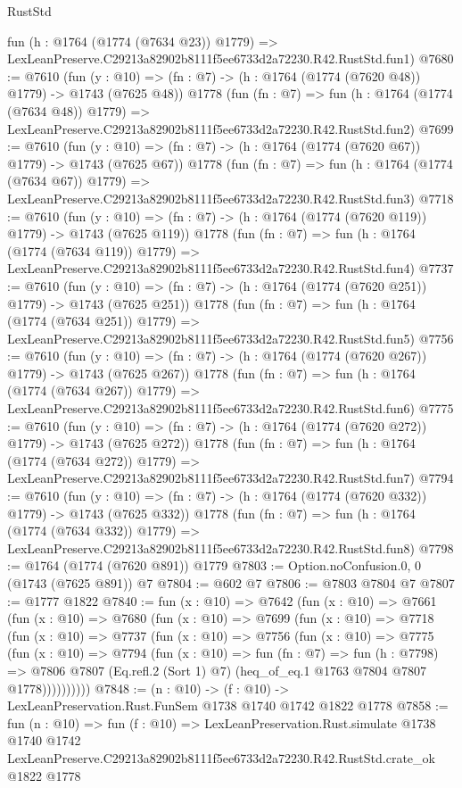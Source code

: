 \begin{lexlean}{RustStd}
\begin{coremodule}
    fun (h : @1764 (@1774 (@7634 @23)) @1779) =>
    LexLeanPreserve.C29213a82902b8111f5ee6733d2a72230.R42.RustStd.fun1)
@7680 := @7610
    (fun (y : @10) => (fn : @7) -> (h : @1764 (@1774 (@7620 @48)) @1779) -> @1743 (@7625 @48))
    @1778
    (fun (fn : @7) =>
    fun (h : @1764 (@1774 (@7634 @48)) @1779) =>
    LexLeanPreserve.C29213a82902b8111f5ee6733d2a72230.R42.RustStd.fun2)
@7699 := @7610
    (fun (y : @10) => (fn : @7) -> (h : @1764 (@1774 (@7620 @67)) @1779) -> @1743 (@7625 @67))
    @1778
    (fun (fn : @7) =>
    fun (h : @1764 (@1774 (@7634 @67)) @1779) =>
    LexLeanPreserve.C29213a82902b8111f5ee6733d2a72230.R42.RustStd.fun3)
@7718 := @7610
    (fun (y : @10) => (fn : @7) -> (h : @1764 (@1774 (@7620 @119)) @1779) -> @1743 (@7625 @119))
    @1778
    (fun (fn : @7) =>
    fun (h : @1764 (@1774 (@7634 @119)) @1779) =>
    LexLeanPreserve.C29213a82902b8111f5ee6733d2a72230.R42.RustStd.fun4)
@7737 := @7610
    (fun (y : @10) => (fn : @7) -> (h : @1764 (@1774 (@7620 @251)) @1779) -> @1743 (@7625 @251))
    @1778
    (fun (fn : @7) =>
    fun (h : @1764 (@1774 (@7634 @251)) @1779) =>
    LexLeanPreserve.C29213a82902b8111f5ee6733d2a72230.R42.RustStd.fun5)
@7756 := @7610
    (fun (y : @10) => (fn : @7) -> (h : @1764 (@1774 (@7620 @267)) @1779) -> @1743 (@7625 @267))
    @1778
    (fun (fn : @7) =>
    fun (h : @1764 (@1774 (@7634 @267)) @1779) =>
    LexLeanPreserve.C29213a82902b8111f5ee6733d2a72230.R42.RustStd.fun6)
@7775 := @7610
    (fun (y : @10) => (fn : @7) -> (h : @1764 (@1774 (@7620 @272)) @1779) -> @1743 (@7625 @272))
    @1778
    (fun (fn : @7) =>
    fun (h : @1764 (@1774 (@7634 @272)) @1779) =>
    LexLeanPreserve.C29213a82902b8111f5ee6733d2a72230.R42.RustStd.fun7)
@7794 := @7610
    (fun (y : @10) => (fn : @7) -> (h : @1764 (@1774 (@7620 @332)) @1779) -> @1743 (@7625 @332))
    @1778
    (fun (fn : @7) =>
    fun (h : @1764 (@1774 (@7634 @332)) @1779) =>
    LexLeanPreserve.C29213a82902b8111f5ee6733d2a72230.R42.RustStd.fun8)
@7798 := @1764 (@1774 (@7620 @891)) @1779
@7803 := Option.noConfusion.{0, 0} (@1743 (@7625 @891)) @7
@7804 := @602 @7
@7806 := @7803 @7804 @7
@7807 := @1777 @1822
@7840 := fun (x : @10) =>
  @7642
    (fun (x : @10) =>
    @7661
      (fun (x : @10) =>
      @7680
        (fun (x : @10) =>
        @7699
          (fun (x : @10) =>
          @7718
            (fun (x : @10) =>
            @7737
              (fun (x : @10) =>
              @7756
                (fun (x : @10) =>
                @7775
                  (fun (x : @10) =>
                  @7794
                    (fun (x : @10) =>
                    fun (fn : @7) =>
                    fun (h : @7798) =>
                    @7806
                      @7807
                      (Eq.refl.{2} (Sort 1) @7)
                      (heq_of_eq.{1} @1763 @7804 @7807 @1778))))))))))
@7848 := (n : @10) -> (f : @10) -> LexLeanPreservation.Rust.FunSem @1738 @1740 @1742 @1822 @1778
@7858 := fun (n : @10) =>
  fun (f : @10) =>
  LexLeanPreservation.Rust.simulate
    @1738
    @1740
    @1742
    LexLeanPreserve.C29213a82902b8111f5ee6733d2a72230.R42.RustStd.crate_ok
    @1822
    @1778
\end{coremodule}
\end{lexlean}
